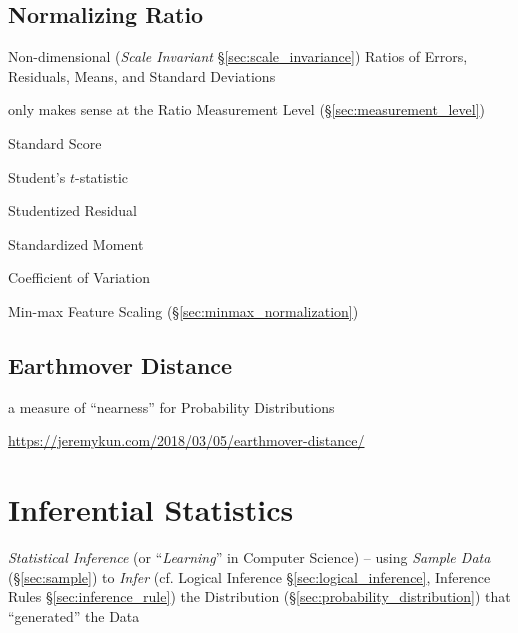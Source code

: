 \subsection{Normalizing Ratio}\label{sec:normalizing_ratio}

Non-dimensional (\emph{Scale Invariant} \S\ref{sec:scale_invariance}) Ratios of
Errors, Residuals, Means, and Standard Deviations

only makes sense at the Ratio Measurement Level (\S\ref{sec:measurement_level})

Standard Score

Student's $t$-statistic

Studentized Residual

Standardized Moment

Coefficient of Variation

Min-max Feature Scaling (\S\ref{sec:minmax_normalization})



\subsection{Earthmover Distance}\label{sec:earthmover_distance}


a measure of ``nearness'' for Probability Distributions

\url{https://jeremykun.com/2018/03/05/earthmover-distance/}



\section{Inferential Statistics}\label{sec:inferential_statistics}

\emph{Statistical Inference} (or ``\emph{Learning}'' in Computer Science) --
using \emph{Sample Data} (\S\ref{sec:sample}) to \emph{Infer} (cf. Logical
Inference \S\ref{sec:logical_inference}, Inference Rules
\S\ref{sec:inference_rule}) the Distribution
(\S\ref{sec:probability_distribution}) that ``generated'' the Data

